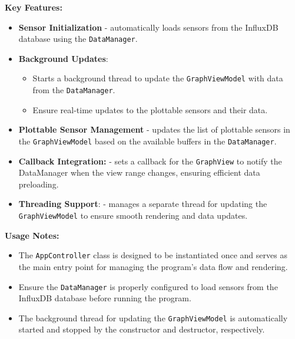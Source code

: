 \documentclass{article}
\begin{document}
\vspace{5pt}
\noindent
\textbf{Key Features:}
\begin{itemize}
    \item \textbf{Sensor Initialization} - automatically loads sensors from the InfluxDB database using the \texttt{DataManager}.
    
    \item \textbf{Background Updates}:
    \begin{itemize}
        \item Starts a background thread to update the \texttt{GraphViewModel} with data from the \texttt{DataManager}.

        \item Ensure real-time updates to the plottable sensors and their data.
    \end{itemize}
    
    \item \textbf{Plottable Sensor Management} - updates the list of plottable sensors in the \texttt{GraphViewModel} based on the available buffers in the \texttt{DataManager}.

    \item \textbf{Callback Integration:} - sets a callback for the \texttt{GraphView} to notify the DataManager when the view range changes, ensuring efficient data preloading.

    \item \textbf{Threading Support}: - manages a separate thread for updating the \texttt{GraphViewModel} to ensure smooth rendering and data updates.
\end{itemize}

\vspace{5pt}
\noindent
\textbf{Usage Notes:}
\begin{itemize}
    \item The \texttt{AppController} class is designed to be instantiated once and serves as the main entry point for managing the program's data flow and rendering.

    \item Ensure the \texttt{DataManager} is properly configured to load sensors from the InfluxDB database before running the program.

    \item The background thread for updating the \texttt{GraphViewModel} is automatically started and stopped by the constructor and destructor, respectively.
\end{itemize}
\end{document}
